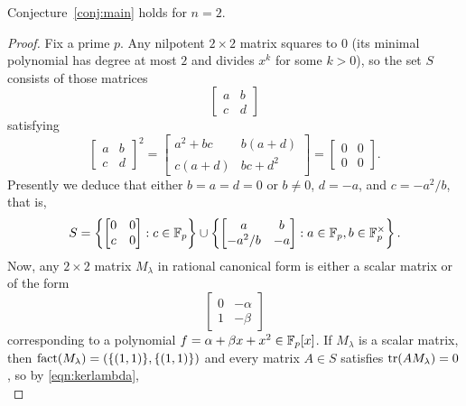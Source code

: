 \begin{prop}
\label{prop:2by2case}
Conjecture~\ref{conj:main} holds for $n=2$.
\end{prop}
\begin{proof}
Fix a prime $p$. Any nilpotent $2\times 2$ matrix squares to $0$ (its minimal polynomial has degree at most $2$ and divides $x^k$ for some $k>0$), so the set $S$ consists of those matrices
\begin{equation*}
\begin{bmatrix}
a&b\\
c&d
\end{bmatrix}
\end{equation*}
satisfying
\begin{equation}
\label{eqn:squarezero}
\begin{bmatrix}
a&b\\
c&d
\end{bmatrix}^2
=
\begin{bmatrix}
a^2+bc&b(a+d)\\
c(a+d)&bc+d^2
\end{bmatrix}
=
\begin{bmatrix}
0&0\\
0&0
\end{bmatrix}.
\end{equation}
Presently we deduce that either $b=a=d=0$ or $b\ne 0$, $d=-a$, and $c=-a^2/b$, that is,
\begin{equation}
\label{eqn:nilptwo}
S=\left\{\begin{bmatrix}
0&0\\
c&0
\end{bmatrix}:c\in\mathbb{F}_p\right\}\cup\left\{\begin{bmatrix}
a&b\\
-a^2/b&-a
\end{bmatrix}:a\in\mathbb{F}_p,b\in\mathbb{F}_p^\times\right\}.
\end{equation}
Now, any $2\times 2$ matrix $M_\lambda$ in rational canonical form is either a scalar matrix or of the form
\begin{equation}
\label{eqn:rcftwo}
\begin{bmatrix}
0&-\alpha\\
1&-\beta
\end{bmatrix}
\end{equation}
corresponding to a polynomial $f=\alpha+\beta x+x^2\in\mathbb{F}_p[x]$. If $M_\lambda$ is a scalar matrix, then $\operatorname{fact}(M_\lambda)=(\{(1,1)\},\{(1,1)\})$ and every matrix $A\in S$ satisfies $\operatorname{tr}(AM_\lambda)=0$, so by \eqref{eqn:kerlambda},
\begin{equation*}

\end{equation*}
\end{proof}
